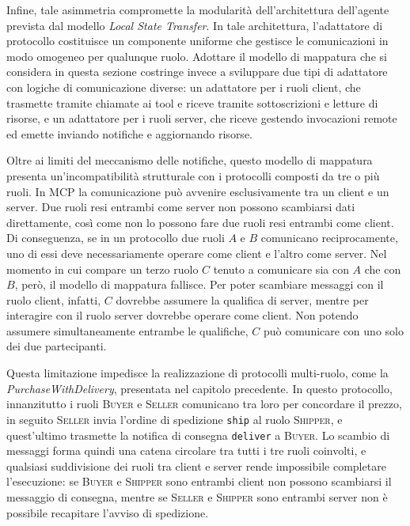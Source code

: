 Infine, tale asimmetria compromette la modularità dell'architettura dell'agente prevista dal modello \emph{Local State Transfer}. In tale architettura, l'adattatore di protocollo costituisce un componente uniforme che gestisce le comunicazioni in modo omogeneo per qualunque ruolo. Adottare il modello di mappatura che si considera in questa sezione costringe invece a sviluppare due tipi di adattatore con logiche di comunicazione diverse: un adattatore per i ruoli client, che trasmette tramite chiamate ai tool e riceve tramite sottoscrizioni e letture di risorse, e un adattatore per i ruoli server, che riceve gestendo invocazioni remote ed emette inviando notifiche e aggiornando risorse.

Oltre ai limiti del meccanismo delle notifiche, questo modello di mappatura presenta un'incompatibilità strutturale con i protocolli composti da tre o più ruoli. In MCP la comunicazione può avvenire esclusivamente tra un client e un server. Due ruoli resi entrambi come server non possono scambiarsi dati direttamente, così come non lo possono fare due ruoli resi entrambi come client. Di conseguenza, se in un protocollo due ruoli $A$ e $B$ comunicano reciprocamente, uno di essi deve necessariamente operare come client e l'altro come server. Nel momento in cui compare un terzo ruolo $C$ tenuto a comunicare sia con $A$ che con $B$, però, il modello di mappatura fallisce. Per poter scambiare messaggi con il ruolo client, infatti, $C$ dovrebbe assumere la qualifica di server, mentre per interagire con il ruolo server dovrebbe operare come client. Non potendo assumere simultaneamente entrambe le qualifiche, $C$ può comunicare con uno solo dei due partecipanti.

Questa limitazione impedisce la realizzazione di protocolli multi-ruolo, come la  \emph{PurchaseWithDelivery}, presentata nel capitolo precedente. In questo protocollo, innanzitutto i ruoli \textsc{Buyer} e \textsc{Seller} comunicano tra loro per concordare il prezzo, in seguito \textsc{Seller} invia l'ordine di spedizione \lstinline|ship| al ruolo \textsc{Shipper}, e quest'ultimo trasmette la notifica di consegna \lstinline|deliver| a \textsc{Buyer}. Lo scambio di messaggi forma quindi una catena circolare tra tutti i tre ruoli coinvolti, e qualsiasi suddivisione dei ruoli tra client e server rende impossibile completare l'esecuzione: se \textsc{Buyer} e \textsc{Shipper} sono entrambi client non possono scambiarsi il messaggio di consegna, mentre se \textsc{Seller} e \textsc{Shipper} sono entrambi server non è possibile recapitare l'avviso di spedizione.


